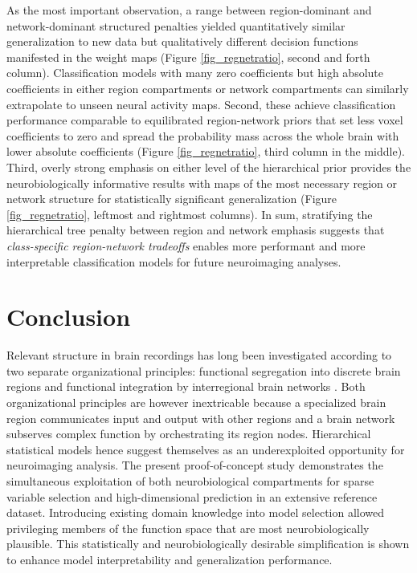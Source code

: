\documentclass[runningheads,a4paper]{llncs}
\begin{document}
As the most important observation,
a range between region-dominant and network-dominant structured penalties
yielded quantitatively similar generalization to new data
but qualitatively different decision functions manifested in the weight maps
(Figure \ref{fig_regnetratio}, second and forth column).
Classification models with many zero coefficients but high absolute
coefficients in either region compartments or network compartments
can similarly extrapolate to unseen neural activity maps.
Second,
these achieve classification performance
comparable to equilibrated region-network priors
that set less voxel coefficients to zero and spread the
probability mass across the whole brain
with lower absolute coefficients
(Figure \ref{fig_regnetratio}, third column in the middle).
Third,
overly strong emphasis on either level of the hierarchical prior
provides the neurobiologically informative results with maps
of the most necessary region or network structure for
statistically significant generalization
(Figure \ref{fig_regnetratio}, leftmost and rightmost columns).
%
In sum,
stratifying the hierarchical tree penalty between region and network emphasis
suggests that \textit{class-specific region-network tradeoffs}
enables more performant and more interpretable classification models
for future neuroimaging analyses.

\section{Conclusion}
Relevant structure in brain recordings has long been investigated
according to two separate organizational principles:
functional segregation into discrete brain regions
\cite{passingham2002}
and functional integration by interregional brain networks
\cite{sporns14nn}.
Both organizational principles are however inextricable because
a specialized brain region communicates input and output with other regions
and a brain network subserves complex function by
orchestrating its region nodes.
Hierarchical statistical models hence suggest themselves
as an underexploited opportunity for neuroimaging analysis.
%
The present proof-of-concept study demonstrates the simultaneous exploitation of
both neurobiological compartments
for sparse variable selection and high-dimensional prediction
in an extensive reference dataset.
%
Introducing existing domain knowledge into model selection
allowed privileging members of the function space
that are most neurobiologically plausible.
%
This statistically and neurobiologically desirable simplification
is shown to enhance
model interpretability and generalization performance.
\end{document}
